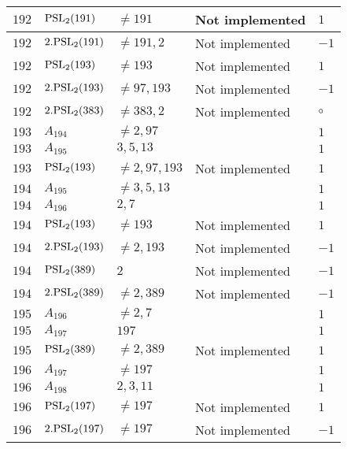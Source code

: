 \documentclass[a4paper, 11pt]{article}
\begin{document}
\begin{longtable}{lllll}
        $ 192 $ & $ {\rm PSL}_{2}(191) $ & $ \neq 191 $ & Not implemented & $ 1  $ \\ \hline
        $ 192 $ & $ 2.{\rm PSL}_{2}(191) $ & $ \neq 191, 2 $ & Not implemented & $ -1  $ \\ \hline
        $ 192 $ & $ {\rm PSL}_{2}(193) $ & $ \neq 193 $ & Not implemented & $ 1  $ \\ \hline
        $ 192 $ & $ 2.{\rm PSL}_{2}(193) $ & $ \neq 97, 193 $ & Not implemented & $ -1  $ \\ \hline
        $ 192 $ & $ 2.{\rm PSL}_{2}(383) $ & $ \neq 383, 2 $ & Not implemented & $\circ$ \\ \hline
        $ 193 $ & $ A_{194} $ & $ \neq 2, 97 $ & $ ~ $ & $ 1  $ \\ \hline
        $ 193 $ & $ A_{195} $ & $ 3, 5, 13 $ & $ ~ $ & $ 1  $ \\ \hline
        $ 193 $ & $ {\rm PSL}_{2}(193) $ & $ \neq 2, 97, 193 $ & Not implemented & $ 1  $ \\ \hline
        $ 194 $ & $ A_{195} $ & $ \neq 3, 5, 13 $ & $ ~ $ & $ 1  $ \\ \hline
        $ 194 $ & $ A_{196} $ & $ 2, 7 $ & $ ~ $ & $ 1  $ \\ \hline
        $ 194 $ & $ {\rm PSL}_{2}(193) $ & $ \neq 193 $ & Not implemented & $ 1  $ \\ \hline
        $ 194 $ & $ 2.{\rm PSL}_{2}(193) $ & $ \neq 2, 193 $ & Not implemented & $ -1  $ \\ \hline
        $ 194 $ & $ {\rm PSL}_{2}(389) $ & $ 2 $ & Not implemented & $ -1  $ \\ \hline
        $ 194 $ & $ 2.{\rm PSL}_{2}(389) $ & $ \neq 2, 389 $ & Not implemented & $ -1  $ \\ \hline
        $ 195 $ & $ A_{196} $ & $ \neq 2, 7 $ & $ ~ $ & $ 1  $ \\ \hline
        $ 195 $ & $ A_{197} $ & $ 197 $ & $ ~ $ & $ 1  $ \\ \hline
        $ 195 $ & $ {\rm PSL}_{2}(389) $ & $ \neq 2, 389 $ & Not implemented & $ 1  $ \\ \hline
        $ 196 $ & $ A_{197} $ & $ \neq 197 $ & $ ~ $ & $ 1  $ \\ \hline
        $ 196 $ & $ A_{198} $ & $ 2, 3, 11 $ & $ ~ $ & $ 1  $ \\ \hline
        $ 196 $ & $ {\rm PSL}_{2}(197) $ & $ \neq 197 $ & Not implemented & $ 1  $ \\ \hline
        $ 196 $ & $ 2.{\rm PSL}_{2}(197) $ & $ \neq 197 $ & Not implemented & $ -1  $ \\ \hline

\end{longtable}
\end{document}
